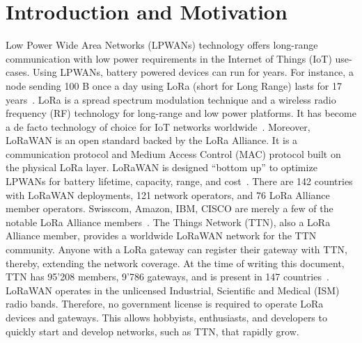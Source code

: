 \chapter{Introduction and Motivation}
\label{thesis:introduction}
Low Power Wide Area Networks (LPWANs) technology offers long-range communication with low power requirements in the Internet of Things (IoT) use-cases. 
Using LPWANs, battery powered devices can run for years.
For instance, a node sending 100 B once a day using LoRa (short for Long Range) lasts for 17 years~\cite{morin}.
LoRa is a spread spectrum modulation technique and a wireless radio frequency (RF) technology for long-range and low power platforms.
It has become a de facto technology of choice for IoT networks worldwide~\cite{what_is_lora}.
Moreover, LoRaWAN is an open standard backed by the LoRa Alliance. 
It is a communication protocol and Medium Access Control (MAC) protocol built on the physical LoRa layer.
LoRaWAN is designed ``bottom up'' to optimize LPWANs for battery lifetime, capacity, range, and cost~\cite{what_is_lora_wan}.
There are 142 countries with LoRaWAN deployments, 121 network operators, and 76 LoRa Alliance member operators. 
Swisscom, Amazon, IBM, CISCO are merely a few of the notable LoRa Alliance members~\cite{lora_alliance}.
The Things Network (TTN), also a LoRa Alliance member, provides a worldwide LoRaWAN network for the TTN community. 
Anyone with a LoRa gateway can register their gateway with TTN, thereby, extending the network coverage. 
At the time of writing this document, TTN has 95'208 members, 9'786 gateways, and is present in 147 countries~\cite{ttn}. 
LoRaWAN operates in the unlicensed Industrial, Scientific and Medical (ISM) radio bands. 
Therefore, no government license is required to operate LoRa devices and gateways. 
This allows hobbyists, enthusiasts, and developers to quickly start and develop networks, such as TTN, that rapidly grow.

